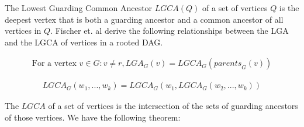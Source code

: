 The Lowest Guarding Common Ancestor $LGCA(Q)$ of a set of vertices $Q$ is the deepest vertex that is both a guarding ancestor and a common ancestor of all vertices in $Q$. Fischer et. al \cite{fischer2010new} derive the following relationships between the LGA and the LGCA of vertices in a rooted DAG.



\begin{lemma}\label{lgaislgcaofparents}
	\begin{align*}
		\text{For a vertex } v \in G: v \neq r , LGA_G(v) = LGCA_G(\mathit{parents}_G(v))
	\end{align*}

\end{lemma}


\begin{definition}\label{associativelsca}
	\begin{align*}
		LGCA_G (w_1, ... ,w_k) = LGCA_G (w_1, LGCA_G (w_2, ... ,w_k))
	\end{align*}

\end{definition}



The $LGCA$ of a set of vertices is the intersection of the sets of guarding ancestors of those vertices. We have the following theorem:

